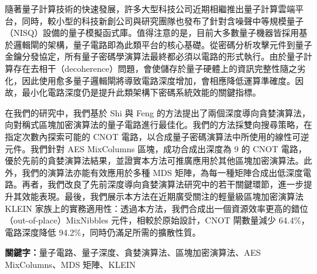 隨著量子計算技術的快速發展，許多大型科技公司近期相繼推出量子計算雲端平台，同時，較小型的科技新創公司與研究團隊也發布了針對含噪聲中等規模量子（NISQ）設備的量子模擬函式庫。值得注意的是，目前大多數量子機器皆採用基於邏輯閘的架構，量子電路即為此類平台的核心基礎。從密碼分析攻擊元件到量子金鑰分發協定，所有量子密碼學演算法最終都必須以電路的形式執行。由於量子計算存在去相干（decoherence）問題，會使儲存於量子硬體上的資訊完整性隨之劣化，因此使用愈多量子邏輯閘將導致電路深度增加，會相應降低運算準確度。因故，最小化電路深度仍是提升此類架構下密碼系統效能的關鍵指標。

在我們的研究中，我們基於 Shi 與 Feng 的方法提出了兩個深度導向貪婪演算法，向對稱式區塊加密演算法的量子電路進行最佳化。我們的方法採雙向搜尋策略，在指定次數內探索可能的 CNOT 電路，以合成量子密碼演算法中所使用的線性可逆元件。我們針對 AES MixColumns 區塊，成功合成出深度為 9 的 CNOT 電路，優於先前的貪婪演算法結果，並證實本方法可推廣應用於其他區塊加密演算法。此外，我們的演算法亦能有效應用於多種 MDS 矩陣，為每一種矩陣合成出低深度電路。再者，我們改良了先前深度導向貪婪演算法研究中的若干關鍵環節，進一步提升其效能表現。最後，我們展示本方法在近期廣受關注的輕量級區塊加密演算法 KLEIN 家族上的實務適用性：透過本方法，我們合成出一個資源效率更高的錯位（out-of-place）MixNibbles 元件，相較於原始設計，CNOT 閘數量減少 64.4\%，電路深度降低 94.2\%，同時仍滿足所需的擴散性質。

\medskip
\textbf{關鍵字：}量⼦電路、量⼦深度、貪婪演算法、區塊加密演算法、AES MixColumns、MDS 矩陣、KLEIN